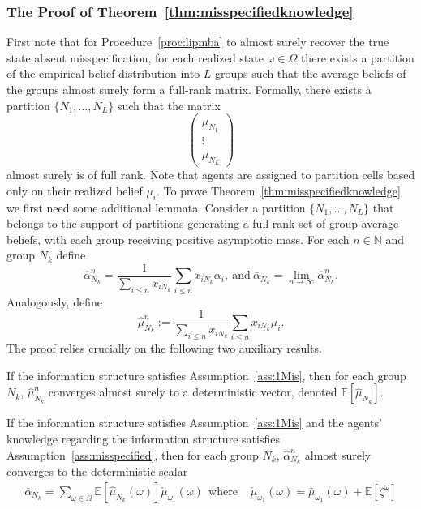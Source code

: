\documentclass[12pt,reqno]{amsart}
\begin{document}
\subsubsection{The Proof of Theorem~\ref{thm:misspecifiedknowledge}}
First note that for Procedure~\ref{proc:lipmba} to almost surely recover the true state absent misspecification, for each realized state $\omega \in \Omega$ there exists a partition of the empirical belief distribution into $L$ groups such that the average beliefs of the groups almost surely form a full-rank matrix. Formally, there exists a partition $\{N_1,\ldots,N_L\}$ such that the matrix
\[
\begin{pmatrix}
\hat{\mu}_{N_1} \\
\vdots \\
\hat{\mu}_{N_L}
\end{pmatrix}
\]
almost surely is of full rank. Note that agents are assigned to partition cells based only on their realized belief $\mu_i$.
To prove Theorem~\ref{thm:misspecifiedknowledge} we first need some additional lemmata.
Consider a partition $\{N_1,\ldots,N_L\}$ that belongs to the support of partitions generating a full-rank set of group average beliefs, with each group receiving positive asymptotic mass. For each $n\in\mathbb{N}$ and group $N_k$ define
\begin{equation}\label{eq:2ndordermis}
    \hat{\alpha}_{N_k}^n=\frac{1}{\sum_{i\le n}x_{iN_k}}\sum_{i\leq n} x_{iN_k}\alpha_i, \ \text{and} \ \bar{\alpha}_{N_k}=\lim_{n \rightarrow \infty} \hat{\alpha}_{N_k}^n.
\end{equation}
Analogously, define
\[
\hat{\mu}_{N_k}^n:=\frac{1}{\sum_{i\le n}x_{iN_k}}\sum_{i\leq n} x_{iN_k}\mu_i.
\]
The proof relies crucially on the following two auxiliary results.
\begin{lemma}\label{lem:misspec2}
If the information structure satisfies Assumption~\ref{ass:1Mis}, then for each group $N_k$, $\hat{\mu}_{N_k}^n$ converges almost surely to a deterministic vector, denoted $\mathbb{E}[\hat{\mu} _{N_k}]$.
\end{lemma}
\begin{lemma}\label{lem:misspec}
If the information structure satisfies Assumption~\ref{ass:1Mis} and the agents' knowledge regarding the information structure satisfies Assumption~\ref{ass:misspecified}, then for each group $N_k$, $\hat{\alpha}_{N_k}^n$ almost surely converges to the deterministic scalar
\begin{align*}
\bar{\alpha}_{N_k}=\sum_{\omega \in \Omega} \mathbb{E}[\hat{\mu}_{N_k}(\omega)]\check{\mu}_{\omega_1}(\omega)
\ \ \text{where }&\check{\mu}_{\omega_1}(\omega) =\bar{\mu}_{\omega_1}(\omega)+\mathbb{E}[\zeta^{\omega}]
\end{align*}
\end{lemma}
\end{document}

